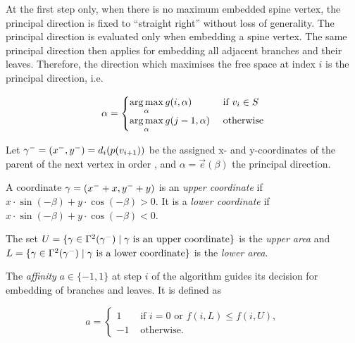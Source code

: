 At the first step only, when there is no maximum embedded spine vertex, the principal direction is fixed to ``straight right'' without loss of generality.
The principal direction is evaluated only when embedding a spine vertex. The same principal direction then applies for embedding all adjacent branches and their leaves. Therefore, the direction which maximises the free space at index $i$ is the principal direction, i.e. 

\begin{equation*}
\alpha = \begin{cases}\underset{\alpha}{\arg \max}\, g(i, \alpha) & \text{ if $v_i \in S$}\\
\underset{\alpha}{\arg \max}\, g(j-1, \alpha) & \text{ otherwise}
\end{cases}
\end{equation*}

Let $\gamma^- = (x^-, y^-) = d_i(p(v_{i+1}))$ be the assigned x- and y-coordinates of the parent of the next vertex in order
, and $\alpha = \overrightarrow e(\beta)$ the principal direction.

A coordinate $\gamma = (x^- + x, y^- + y)$ is an \emph{upper coordinate} if $x \cdot \sin (-\beta) + y \cdot \cos (-\beta) > 0$. It is a \emph{lower coordinate} if $x \cdot \sin (-\beta) + y \cdot \cos (-\beta) < 0$.

The set $U = \{ \gamma \in \Gamma^2(\gamma^-) \mid \gamma \text{ is an upper coordinate} \}$ is the \emph{upper area} and $L = \{ \gamma \in \Gamma^2(\gamma^-) \mid \gamma \text{ is a lower coordinate} \}$ is the \emph{lower area}.

The \emph{affinity} $a \in \{-1, 1\}$ at step $i$ of the algorithm guides its decision for embedding of branches and leaves. It is defined as

\begin{equation*}
a = \begin{cases}1 & \text{ if } i = 0 \text{ or } f(i, L) \leq f(i, U), \\
-1 & \text{ otherwise.}
\end{cases}
\end{equation*}


